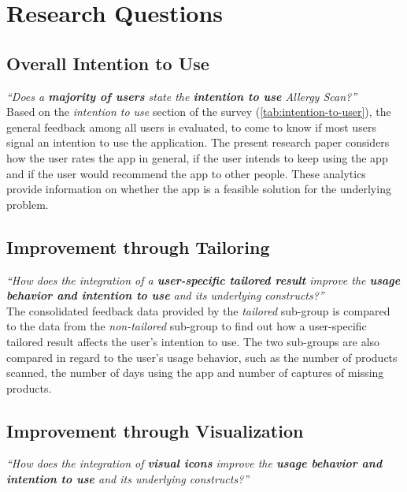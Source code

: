 

\section{Research Questions}
\label{sec:research-questions}
\subsection{Overall Intention to Use}
\textit{\enquote{Does a \textbf{majority of users} state the \textbf{intention to use} Allergy Scan?}}\\

Based on the \emph{intention to use} section of the survey (\cref{tab:intention-to-user}), the general feedback among all users is evaluated, to come to know if most users signal an intention to use the application. The present research paper considers how the user rates the app in general, if the user intends to keep using the app and if the user would recommend the app to other people. These analytics provide information on whether the app is a feasible solution for the underlying problem.

\subsection{Improvement through Tailoring}
\label{rc:tailoring}
\textit{\enquote{How does the integration of a \textbf{user-specific tailored result} improve the \textbf{usage behavior and intention to use} and its underlying constructs?}}\\

The consolidated feedback data provided by the \emph{tailored} sub-group is compared to the data from the \emph{non-tailored} sub-group to find out how a user-specific tailored result affects the user's intention to use. The two sub-groups are also compared in regard to the user's usage behavior, such as the number of products scanned, the number of days using the app and number of captures of missing products.

\subsection{Improvement through Visualization}
\textit{\enquote{How does the integration of \textbf{visual icons} improve the \textbf{usage behavior and intention to use} and its underlying constructs?}}\\

